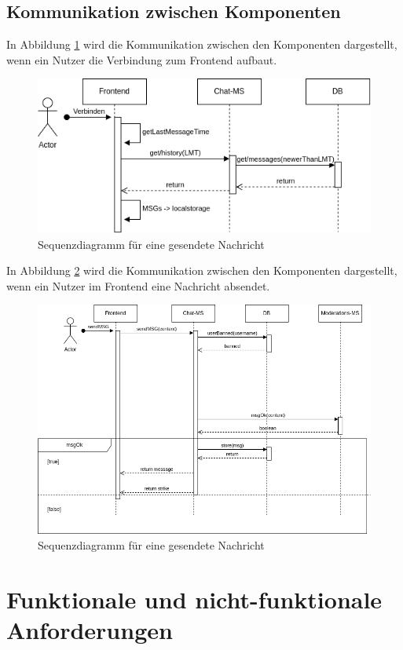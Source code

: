 \documentclass[12pt]{report}
\begin{document}
\subsection{Kommunikation zwischen Komponenten}
In Abbildung \ref{fig:seq_start} wird die Kommunikation zwischen den Komponenten dargestellt, wenn ein Nutzer die Verbindung zum Frontend aufbaut.
\begin{figure}[htbp]
	\centering
	\includegraphics[width=\linewidth]{sequence_start}
	\caption{Sequenzdiagramm für eine gesendete Nachricht}
	\label{fig:seq_start}
\end{figure}

In Abbildung \ref{fig:seq_msg} wird die Kommunikation zwischen den Komponenten dargestellt, wenn ein Nutzer im Frontend eine Nachricht absendet.
\begin{figure}[htbp]
	\centering
	\includegraphics[width=\linewidth]{sequence_msg}
	\caption{Sequenzdiagramm für eine gesendete Nachricht}
	\label{fig:seq_msg}
\end{figure}

\section{Funktionale und nicht-funktionale Anforderungen}
\end{document}
